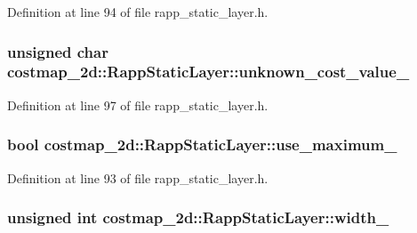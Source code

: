 Definition at line 94 of file rapp\-\_\-static\-\_\-layer.\-h.

\hypertarget{classcostmap__2d_1_1RappStaticLayer_a1eaa2242b66c95ca1daf7a7d4d99c2c2}{
\subsubsection[{unknown\-\_\-cost\-\_\-value\-\_\-}]{\setlength{\rightskip}{0pt plus 5cm}unsigned char costmap\-\_\-2d\-::\-Rapp\-Static\-Layer\-::unknown\-\_\-cost\-\_\-value\-\_\-\hspace{0.3cm}{\ttfamily [private]}}}\label{classcostmap__2d_1_1RappStaticLayer_a1eaa2242b66c95ca1daf7a7d4d99c2c2}


Definition at line 97 of file rapp\-\_\-static\-\_\-layer.\-h.

\hypertarget{classcostmap__2d_1_1RappStaticLayer_a9f1de23d69ed6a9d52c68e17c5b57fe7}{
\subsubsection[{use\-\_\-maximum\-\_\-}]{\setlength{\rightskip}{0pt plus 5cm}bool costmap\-\_\-2d\-::\-Rapp\-Static\-Layer\-::use\-\_\-maximum\-\_\-\hspace{0.3cm}{\ttfamily [private]}}}\label{classcostmap__2d_1_1RappStaticLayer_a9f1de23d69ed6a9d52c68e17c5b57fe7}


Definition at line 93 of file rapp\-\_\-static\-\_\-layer.\-h.

\hypertarget{classcostmap__2d_1_1RappStaticLayer_ab987401de34356cd0c997ad64096048c}{
\subsubsection[{width\-\_\-}]{\setlength{\rightskip}{0pt plus 5cm}unsigned int costmap\-\_\-2d\-::\-Rapp\-Static\-Layer\-::width\-\_\-\hspace{0.3cm}{\ttfamily [private]}}}\label{classcostmap__2d_1_1RappStaticLayer_ab987401de34356cd0c997ad64096048c}


